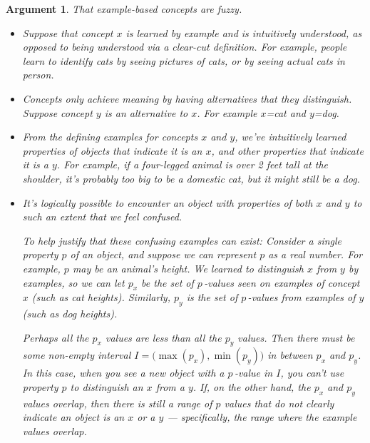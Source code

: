 \documentclass[11pt, oneside]{article}
\theoremstyle{argtstyle}
\newtheorem*{argt}{Argument}
\begin{document}
\begin{argt} That example-based concepts are fuzzy.
    \label{a5}
    \normalfont
    \begin{itemize}
        \item Suppose that concept $x$ is learned by example and is
            intuitively understood, as opposed to being understood via
            a clear-cut definition.
            For
            example, people learn to identify {\em cats}
            by seeing pictures of cats, 
            or by seeing actual cats in person.
        \item Concepts only achieve meaning by having alternatives that they
            distinguish. Suppose concept $y$ is an alternative to $x$.
            For example $x$={\em cat} and $y$={\em dog}.
        \item From the defining examples for concepts $x$ and $y$, we've
            intuitively learned properties of objects
            that indicate it is an $x$, and other properties that indicate it is
            a $y$. For example, if a four-legged animal is over 2 feet tall at
            the
            shoulder, it's probably too big to be a domestic cat, but it might
            still be a dog.
        \item It's logically possible to encounter an object with properties of
            both $x$ and $y$ to such an extent that we feel confused.

            To help justify that these confusing examples can exist:
            Consider a single property $p$
            of an object, and suppose we can represent $p$ as a real number. For
            example, $p$ may be an animal's height. We learned to
            distinguish $x$ from $y$ by examples, so we can let $p_x$ be the set
            of $p$\,-values seen on examples of concept $x$ (such as cat
            heights).  Similarly, $p_y$
            is the set of $p$\,-values from examples of $y$ (such as dog
            heights).

            Perhaps all the $p_x$ values are less than all the $p_y$ values.
            Then there must be some non-empty interval
            $I=\big(\!\max(p_x), \min(p_y)\big)$ in between $p_x$ and $p_y$.
            In this case, when you see a new object with a $p$\,-value in $I$,
            you can't use property $p$ to distinguish an $x$ from a $y$.
            If, on the other hand, the $p_x$ and $p_y$ values overlap, then
            there is still a range of $p$ values
            that do not clearly indicate an object is an $x$ or a $y$ ---
            specifically, the range where the example values overlap.


\end{itemize}
\end{argt}
\end{document}
